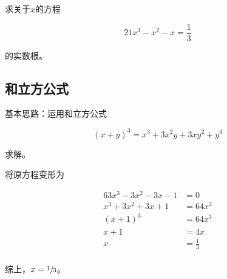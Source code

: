 

求关于$x$的方程

\[ 21x^3 - x^2 - x = \frac13 \]

的实数根。


\subsection{和立方公式}

基本思路：运用和立方公式

\[ (x + y)^3 = x^3 + 3x^2y + 3xy^2 + y^3 \]

求解。

将原方程变形为

\begin{align*}
  63x^3 - 3x^2 - 3x - 1 &= 0 \\
  x^3 + 3x^2 + 3x + 1 &= 64x^3 \\
  (x + 1)^3 &= 64x^3 \\
  x + 1 &= 4x \\
  x &= \frac13 \\
\end{align*}

综上，$x = \sfrac13$。
